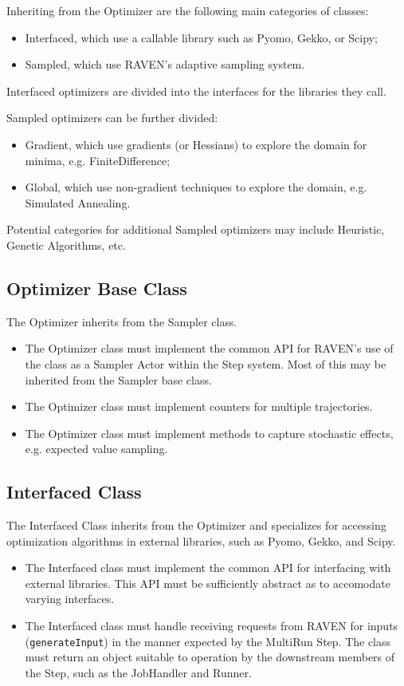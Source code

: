 \documentclass[11pt]{article}
\begin{document}
Inheriting from the Optimizer are the following main categories of classes:
\begin{itemize}
  \item Interfaced, which use a callable library such as Pyomo, Gekko, or Scipy;
  \item Sampled, which use RAVEN's adaptive sampling system.
\end{itemize}

Interfaced optimizers are divided into the interfaces for the libraries they call.

Sampled optimizers can be further divided:
\begin{itemize}
  \item Gradient, which use gradients (or Hessians) to explore the domain for minima, e.g. FiniteDifference;
  \item Global, which use non-gradient techniques to explore the domain, e.g. Simulated Annealing.
\end{itemize}
Potential categories for additional Sampled optimizers may include Heuristic, Genetic Algorithms, etc.

\subsection{Optimizer Base Class}
The Optimizer inherits from the Sampler class.
\begin{itemize}
  \item The Optimizer class must implement the common API for RAVEN's use of the class as a Sampler
  Actor within the Step system. Most of this may be inherited from the Sampler base class.
  \item The Optimizer class must implement counters for multiple trajectories.
  \item The Optimizer class must implement methods to capture stochastic effects, e.g. expected
  value sampling.
\end{itemize}

\subsection{Interfaced Class}
The Interfaced Class inherits from the Optimizer and specializes for accessing optimization
algorithms in external libraries, such as Pyomo, Gekko, and Scipy.
\begin{itemize}
  \item The Interfaced class must implement the common API for interfacing with external libraries.
  This API must be sufficiently abstract as to accomodate varying interfaces.
  \item The Interfaced class must handle receiving requests from RAVEN for inputs (\texttt{generateInput})
  in the manner expected by the MultiRun Step. The class must return an object suitable to operation
  by the downstream members of the Step, such as the JobHandler and Runner.
\end{itemize}
\end{document}
